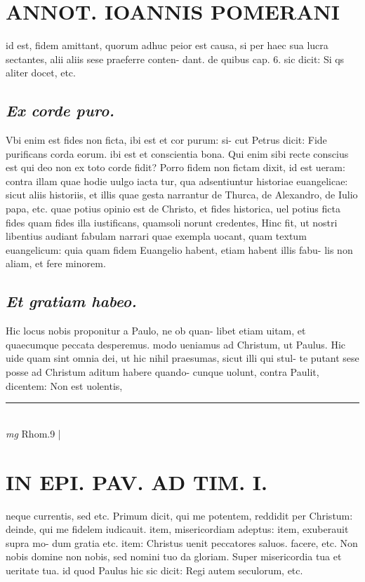 \documentclass{article}
\begin{document}
\begin{pages}
\section*{ANNOT. IOANNIS POMERANI }\pstart id est, fidem amittant, quorum adhuc peior est causa, si per haec sua lucra sectantes, alii aliis sese praeferre conten- dant. de quibus cap. 6. sic dicit: Si qs aliter docet, etc.  \pend
{}
{}
\subsection*{\textit{Ex corde puro. }}\pstart Vbi enim est fides non ficta, ibi est et cor purum: si- cut Petrus dicit: Fide purificans corda eorum. ibi est et conscientia bona. Qui enim sibi recte conscius est qui deo non ex toto corde fidit? Porro fidem non fictam dixit, id est ueram: contra illam quae hodie uulgo iacta tur, qua adsentiuntur historiae euangelicae: sicut aliis historiis, et illis quae gesta narrantur de Thurca, de Alexandro, de Iulio papa, etc. quae potius opinio est de Christo, et fides historica, uel potius ficta fides quam fides illa iustificans, quamsoli norunt credentes, Hinc fit, ut nostri libentius audiant fabulam narrari quae exempla uocant, quam textum euangelicum: quia quam fidem Euangelio habent, etiam habent illis fabu- lis non aliam, et fere minorem.  \pend
{}
{}
\subsection*{\textit{Et gratiam habeo. }}\pstart Hic locus nobis proponitur a Paulo, ne ob quan- libet etiam uitam, et quaecumque  peccata desperemus. modo ueniamus ad Christum, ut Paulus. Hic uide quam sint omnia dei, ut hic nihil praesumas, sicut illi qui stul- te putant sese posse ad Christum aditum habere quando- cunque  uolunt, contra Paulit, dicentem: Non est uolentis,  \pend
\vspace{0.5cm}\noindent
\vspace{0.2cm}\rule{1cm}{0.2pt}\\ 
\hspace{0.2cm}\textit{mg}
\footnotesize Rhom.9 
\normalsize| 
\section*{IN EPI. PAV. AD TIM. I. }
\marginpar{[ p.82 ]}\pstart neque  currentis, sed etc. Primum dicit, qui me potentem, reddidit per Christum: deinde, qui me fidelem iudicauit. item, misericordiam adeptus: item, exuberauit supra mo- dum gratia etc. item: Christus uenit peccatores saluos. facere, etc. Non nobis domine non nobis, sed nomini tuo da gloriam. Super misericordia tua et ueritate tua. id quod Paulus hic sic dicit: Regi autem seculorum, etc.  \pend
{}
{}

\end{pages}
\end{document}
